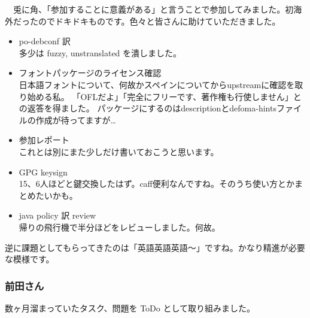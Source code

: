\documentclass[mingoth,a4paper]{jsarticle}
\begin{document}
　兎に角、「参加することに意義がある」と言うことで参加してみました。初海外だったのでドキドキものです。色々と皆さんに助けていただきました。

\begin{itemize}
 
 \item po-debconf 訳\\
       多少は fuzzy, unstranslated を潰しました。
 \item フォントパッケージのライセンス確認\\
       日本語フォントについて、何故かスペインについてからupstreamに確認を取り始める私。
       「OFLだよ」「完全にフリーです、著作権も行使しません」との返答を得ました。
       パッケージにするのはdescriptionとdefoma-hintsファイルの作成が待ってますが…
 \item 参加レポート\\
       これとは別にまた少しだけ書いておこうと思います。
 \item GPG keysign\\
       15、6人ほどと鍵交換したはず。caff便利なんですね。そのうち使い方とかまとめたいかも。
 \item java policy 訳 review\\
       帰りの飛行機で半分ほどをレビューしました。何故。
\end{itemize}

 逆に課題としてもらってきたのは「英語英語英語〜」ですね。かなり精進が必要な模様です。

\subsubsection{前田さん}

数ヶ月溜まっていたタスク、問題を ToDo として取り組みました。
\end{document}
